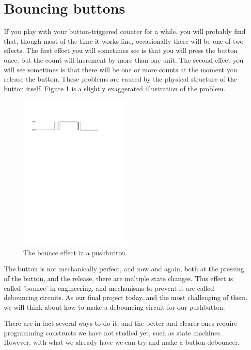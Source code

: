 \documentclass[../physical_computing.tex]{subfiles}
\begin{document}
\section{Bouncing buttons}
\label{sec:bounce}

If you play with your button-triggered counter for a while, you will probably find that, though most of the time it works fine, occasionally there will be one of two effects. The first effect you will sometimes see is that you will press the button once, but the count will increment by more than one unit. The second effect you will see sometimes is that there will be one or more counts at the moment you release the button. These problems are caused by the physical structure of the button itself. Figure \ref{fig:button} is a slightly exaggerated illustration of the problem.

\begin{figure}[htbp]
    \centering
    \includegraphics[width=0.5\textwidth]{figures/button.pdf}
    \caption{The bounce effect in a pushbutton.}
    \label{fig:button}
\end{figure}

The button is not mechanically perfect, and now and again, both at the pressing of the button, and the release, there are multiple state changes. This effect is called 'bounce' in engineering, and mechanisms to prevent it are called debouncing circuits. As our final project today, and the most challenging of them, we will think about how to make a debouncing circuit for our pushbutton.

There are in fact several ways to do it, and the better and clearer ones require programming constructs we have not studied yet, such as state machines. However, with what we already have we can try and make a button debouncer.
\end{document}
